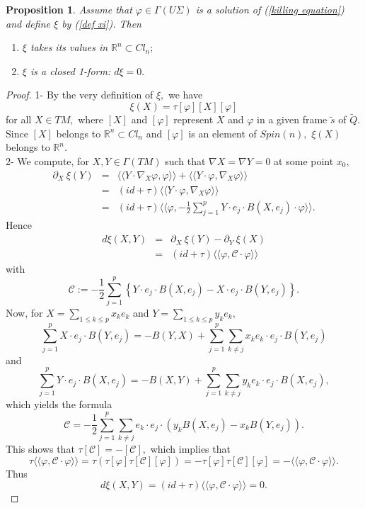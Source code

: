 \documentclass{amsart}
\newtheorem{prop}[lem]{Proposition}
\begin{document}
\begin{prop} \label{lem xi closed}
Assume that $\varphi\in\Gamma(U\Sigma)$ is a solution of (\ref{killing equation}) and define $\xi$ by (\ref{def xi}). Then
\begin{enumerate}
\item $\xi$ takes its values in ${\mathbb{R}}^n\subset Cl_n;$
\item $\xi$ is a closed 1-form: $d\xi=0.$
\end{enumerate} 
\end{prop}
\begin{proof}
1- By the very definition of $\xi,$ we have
$$\xi(X)=\tau[\varphi][X][\varphi]$$  
for all $X\in TM,$ where $[X]$ and $[\varphi]$ represent $X$ and $\varphi$ in a given frame $\tilde{s}$ of $\tilde{Q}.$ Since $[X]$ belongs to ${\mathbb{R}}^n\subset Cl_n$ and $[\varphi]$ is an element of $Spin(n),$ $\xi(X)$ belongs to ${\mathbb{R}}^n.$
\\2- We compute, for $X,Y\in \Gamma(TM)$ such that $\nabla X=\nabla Y=0$ at some point $x_0,$
\begin{eqnarray*}
\partial_X\ \xi(Y)&=&\langle\langle Y\cdot\nabla_X\varphi,\varphi\rangle\rangle+\langle\langle Y\cdot\varphi,\nabla_X\varphi\rangle\rangle\\
&=&(id+\tau)\langle\langle Y\cdot\varphi,\nabla_X\varphi\rangle\rangle\\
&=&(id+\tau)\langle\langle  \varphi,-\frac{1}{2}\sum_{j=1}^pY\cdot e_j\cdot B(X,e_j)\cdot\varphi\rangle\rangle.
\end{eqnarray*}
Hence
\begin{eqnarray*}
d\xi(X,Y)&=&\partial_X\ \xi(Y)-\partial_Y\ \xi(X)\\
&=&(id+\tau)\langle\langle \varphi,\mathcal{C}\cdot\varphi\rangle\rangle
\end{eqnarray*}
with
$$\mathcal{C}:=-\frac{1}{2}\sum_{j=1}^p\left\{Y\cdot e_j\cdot B(X,e_j)-X\cdot e_j\cdot B(Y,e_j)\right\}.$$
Now, for $X=\sum_{1\leq k\leq p} x_k e_k$ and $Y=\sum_{1\leq k\leq p} y_k e_k,$ 
$$\sum_{j=1}^pX\cdot e_j\cdot B(Y,e_j)=-B(Y,X)+\sum_{j=1}^p\sum_{k\neq j}x_ke_k\cdot e_j\cdot B(Y,e_j)$$
and
$$\sum_{j=1}^pY\cdot e_j\cdot B(X,e_j)=-B(X,Y)+\sum_{j=1}^p\sum_{k\neq j}y_ke_k\cdot e_j\cdot B(X,e_j),$$
which yields the formula
$$\mathcal{C}=-\frac{1}{2}\sum_{j=1}^p\sum_{k\neq j}e_k\cdot e_j\cdot(y_kB(X,e_j)-x_kB(Y,e_j)).$$
This shows that $\tau[\mathcal{C}]=-[\mathcal{C}],$ which implies that
$$\tau\langle\langle \varphi,\mathcal{C}\cdot\varphi\rangle\rangle=\tau(\tau[\varphi]\tau[\mathcal{C}][\varphi])=-\tau[\varphi]\tau[\mathcal{C}][\varphi]=-\langle\langle \varphi,\mathcal{C}\cdot\varphi\rangle\rangle.$$
Thus
$$d\xi(X,Y)=(id+\tau)\langle\langle \varphi,\mathcal{C}\cdot\varphi\rangle\rangle=0.$$
\end{proof}
\end{document}
